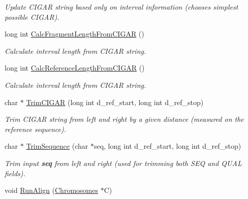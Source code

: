 \begin{DoxyCompactItemize}
\begin{DoxyCompactList}\small\item\em Update CIGAR string based only on interval information (chooses simplest possible CIGAR). \end{DoxyCompactList}\item 
\hypertarget{classGenomicRegionSAM_a5de5d05dfccd33149153a299c1cb2f6b}{
long int \hyperlink{classGenomicRegionSAM_a5de5d05dfccd33149153a299c1cb2f6b}{CalcFragmentLengthFromCIGAR} ()}
\label{classGenomicRegionSAM_a5de5d05dfccd33149153a299c1cb2f6b}

\begin{DoxyCompactList}\small\item\em Calculate interval length from CIGAR string. \end{DoxyCompactList}\item 
\hypertarget{classGenomicRegionSAM_aacff4cd74a3b8c450f9f90c6b23412c4}{
long int \hyperlink{classGenomicRegionSAM_aacff4cd74a3b8c450f9f90c6b23412c4}{CalcReferenceLengthFromCIGAR} ()}
\label{classGenomicRegionSAM_aacff4cd74a3b8c450f9f90c6b23412c4}

\begin{DoxyCompactList}\small\item\em Calculate interval length from CIGAR string. \end{DoxyCompactList}\item 
\hypertarget{classGenomicRegionSAM_a17e8e7054ffe7205d7c34926b60526d8}{
char $\ast$ \hyperlink{classGenomicRegionSAM_a17e8e7054ffe7205d7c34926b60526d8}{TrimCIGAR} (long int d\_\-ref\_\-start, long int d\_\-ref\_\-stop)}
\label{classGenomicRegionSAM_a17e8e7054ffe7205d7c34926b60526d8}

\begin{DoxyCompactList}\small\item\em Trim CIGAR string from left and right by a given distance (measured on the reference sequence). \end{DoxyCompactList}\item 
\hypertarget{classGenomicRegionSAM_a0ff4472118291a8034efc929c784680c}{
char $\ast$ \hyperlink{classGenomicRegionSAM_a0ff4472118291a8034efc929c784680c}{TrimSequence} (char $\ast$seq, long int d\_\-ref\_\-start, long int d\_\-ref\_\-stop)}
\label{classGenomicRegionSAM_a0ff4472118291a8034efc929c784680c}

\begin{DoxyCompactList}\small\item\em Trim input {\bfseries seq} from left and right (used for trimming both SEQ and QUAL fields). \end{DoxyCompactList}\item 
\hypertarget{classGenomicRegionSAM_a97b9fec94e5f21490d839b3f99235a96}{
void \hyperlink{classGenomicRegionSAM_a97b9fec94e5f21490d839b3f99235a96}{RunAlign} (\hyperlink{classChromosomes}{Chromosomes} $\ast$C)}
\label{classGenomicRegionSAM_a97b9fec94e5f21490d839b3f99235a96}


\end{DoxyCompactItemize}
